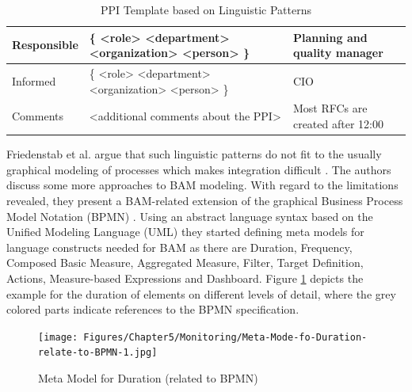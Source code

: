 \begin{table}[htbp]
\begin{tabular}[t]{ p{2 cm} p{5 cm} p{5 cm} }
		\\
		\midrule
		Responsible & \{ <role> \textbar <department> \textbar <organization> \textbar <person> \} &	Planning and quality manager
		\\
		\midrule
		Informed & \{ <role> \textbar <department> \textbar <organization> \textbar <person> \} & CIO
		\\
		\midrule
		Comments & <additional comments about the PPI> & Most RFCs are created after 12:00
		\\
\bottomrule
\end{tabular}
\caption{PPI Template based on Linguistic Patterns \cite{article:ProcessPerfInd}}
\label{tbl:Fact-Sheet-PPI}
\end{table}





Friedenstab et al. argue that such linguistic patterns do not fit to the usually graphical modeling of processes which makes integration difficult \cite{article:BPMNActivityMon}. The authors discuss some more approaches to BAM modeling. With regard to the limitations revealed, they present a BAM-related extension of the graphical Business Process Model Notation (BPMN) \cite{article:BPMNActivityMon}.
Using an abstract language syntax based on the Unified Modeling Language (UML) they started defining meta models for language constructs needed for BAM as there are Duration, Frequency, Composed Basic Measure, Aggregated Measure, Filter, Target Definition, Actions, Measure-based Expressions and Dashboard. Figure \ref{fig:Meta-Model} depicts the example for the duration of elements on different levels of detail, where the grey colored parts indicate references to the BPMN specification.

\begin{figure}[htbp]
	\centering
	\texttt{[image: Figures/Chapter5/Monitoring/Meta-Mode-fo-Duration-relate-to-BPMN-1.jpg]}
	\caption[Meta Model for Duration (related to BPMN) 12]{Meta Model for Duration (related to BPMN) \cite{article:BPMNActivityMon}}
	\label{fig:Meta-Model}
\end{figure}


